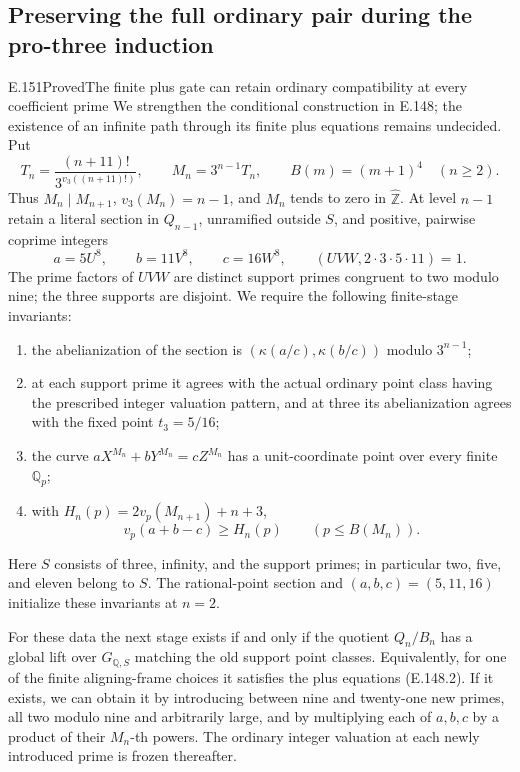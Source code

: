 \subsection{Preserving the full ordinary pair during the pro-three induction}

\begin{result}{E.151}{Proved}{The finite plus gate can retain ordinary compatibility at every coefficient prime}
We strengthen the conditional construction in E.148; the existence of
an infinite path through its finite plus equations remains undecided.
Put
\[
 T_n=\frac{(n+11)!}{3^{v_3((n+11)!)}},\qquad
 M_n=3^{n-1}T_n,\qquad B(m)=(m+1)^4\quad(n\ge2).
 \tag{E.151.1}
\]
Thus \(M_n\mid M_{n+1}\), \(v_3(M_n)=n-1\), and
\(M_n\) tends to zero in \(\widehat{\mathbb Z}\).
At level \(n-1\) retain a literal section in \(Q_{n-1}\),
unramified outside \(S\), and positive, pairwise coprime integers
\[
 a=5U^8,\qquad b=11V^8,\qquad c=16W^8,
 \qquad (UVW,2\cdot3\cdot5\cdot11)=1.
 \tag{E.151.2}
\]
The prime factors of \(UVW\) are distinct support primes congruent
to two modulo nine; the three supports are disjoint.
We require the following finite-stage invariants:
\begin{enumerate}
\item the abelianization of the section is
\((\kappa(a/c),\kappa(b/c))\) modulo \(3^{n-1}\);
\item at each support prime it agrees with the actual ordinary
point class having the prescribed integer valuation pattern, and at
three its abelianization agrees with the fixed point \(t_3=5/16\);
\item the curve \(aX^{M_n}+bY^{M_n}=cZ^{M_n}\) has a
unit-coordinate point over every finite \(\mathbb Q_p\);
\item with \(H_n(p)=2v_p(M_{n+1})+n+3\),
\[
 v_p(a+b-c)\ge H_n(p)\qquad(p\le B(M_n)).
 \tag{E.151.3}
\]
\end{enumerate}
Here \(S\) consists of three, infinity, and the support primes;
in particular two, five, and eleven belong to \(S\).
The rational-point section and \((a,b,c)=(5,11,16)\) initialize
these invariants at \(n=2\).

For these data the next stage exists if and only if the quotient
\(Q_n/B_n\) has a global lift over \(G_{\mathbb Q,S}\)
matching the old support point classes. Equivalently, for one of the
finite aligning-frame choices it satisfies the plus equations
(E.148.2). If it exists, we can obtain it by introducing between
nine and twenty-one new primes, all two modulo nine and arbitrarily
large, and by multiplying each of \(a,b,c\) by a product of their
\(M_n\)-th powers. The ordinary integer valuation at each newly
introduced prime is frozen thereafter.


\end{result}
